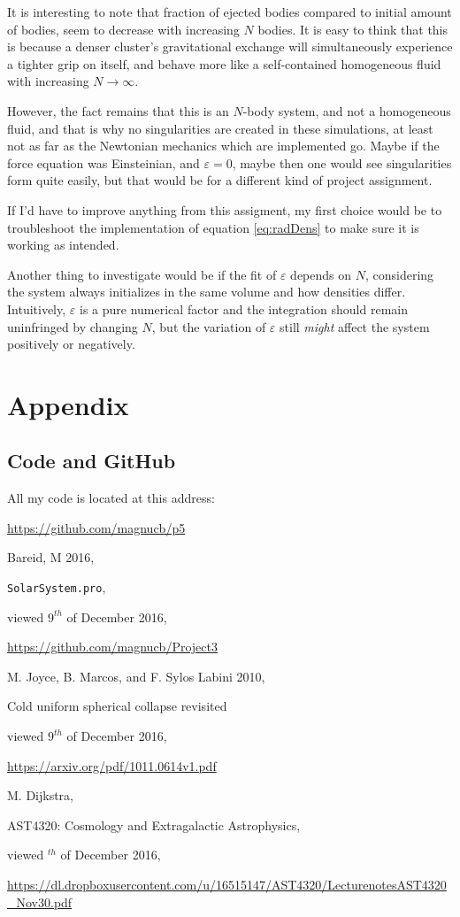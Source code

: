 \documentclass[11pt,a4paper,notitlepage,twocolumn]{article}
\begin{document}
It is interesting to note that fraction of ejected bodies compared to initial amount of bodies, seem to decrease with increasing $N$ bodies. It is easy to think that this is because a denser cluster's gravitational exchange will simultaneously experience a tighter grip on itself, and behave more like a self-contained homogeneous fluid with increasing $N \rightarrow \infty$.

However, the fact remains that this is an $N$-body system, and not a homogeneous fluid, and that is why no singularities are created in these simulations, at least not as far as the Newtonian mechanics which are implemented go. Maybe if the force equation was Einsteinian, and $\varepsilon = 0$, maybe then one would see singularities form quite easily, but that would be for a different kind of project assignment.

If I'd have to improve anything from this assigment, my first choice would be to troubleshoot the implementation of equation \ref{eq:radDens} to make sure it is working as intended.

Another thing to investigate would be if the fit of $\varepsilon$ depends on $N$, considering the system always initializes in the same volume and how densities differ. Intuitively, $\varepsilon$ is a pure numerical factor and the integration should remain uninfringed by changing $N$, but the variation of $\varepsilon$ still \textit{might} affect the system positively or negatively.

\section{Appendix}
\subsection{Code and GitHub}
All my code is located at this address:

\url{https://github.com/magnucb/p5}

\begin{thebibliography}{9}
  Bareid, M 2016,
  
  \verb|SolarSystem.pro|,
  
  viewed $9^{th}$ of December 2016,
  
  \url{https://github.com/magnucb/Project3}	

	M. Joyce, B. Marcos, and F. Sylos Labini 2010,
	
	Cold uniform spherical collapse revisited
	
	viewed $9^{th}$ of December 2016,
		
	\url{https://arxiv.org/pdf/1011.0614v1.pdf}
	
	M. Dijkstra,
	
	AST4320: Cosmology and Extragalactic Astrophysics,
	
	viewed $^{th}$ of December 2016,
	
	\url{https://dl.dropboxusercontent.com/u/16515147/AST4320/LecturenotesAST4320_Nov30.pdf}
\end{thebibliography}
\end{document}

